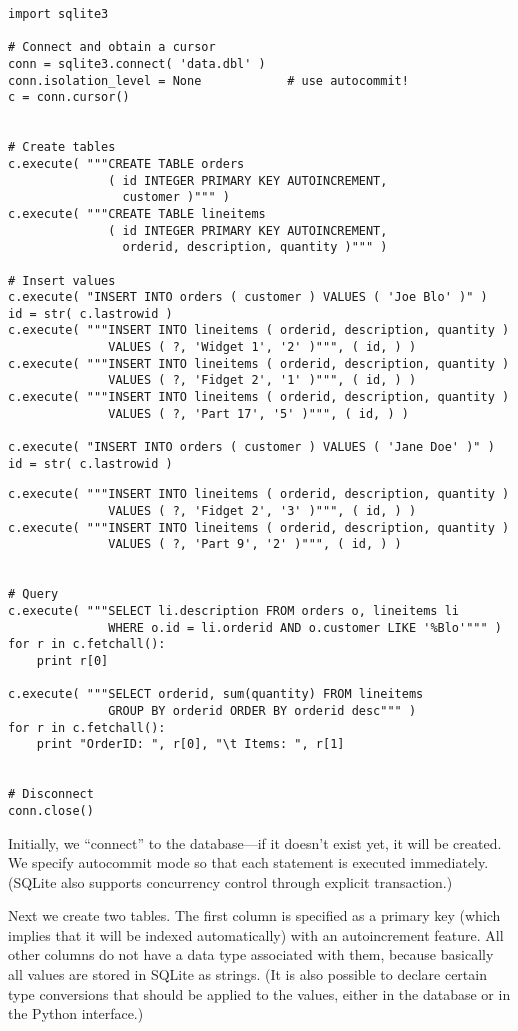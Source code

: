 \begin{verbatim}
import sqlite3

# Connect and obtain a cursor 
conn = sqlite3.connect( 'data.dbl' )
conn.isolation_level = None            # use autocommit!
c = conn.cursor()


# Create tables
c.execute( """CREATE TABLE orders
              ( id INTEGER PRIMARY KEY AUTOINCREMENT,
                customer )""" )
c.execute( """CREATE TABLE lineitems
              ( id INTEGER PRIMARY KEY AUTOINCREMENT,
                orderid, description, quantity )""" )

# Insert values
c.execute( "INSERT INTO orders ( customer ) VALUES ( 'Joe Blo' )" )
id = str( c.lastrowid )
c.execute( """INSERT INTO lineitems ( orderid, description, quantity )
              VALUES ( ?, 'Widget 1', '2' )""", ( id, ) )
c.execute( """INSERT INTO lineitems ( orderid, description, quantity )
              VALUES ( ?, 'Fidget 2', '1' )""", ( id, ) )
c.execute( """INSERT INTO lineitems ( orderid, description, quantity )
              VALUES ( ?, 'Part 17', '5' )""", ( id, ) )

c.execute( "INSERT INTO orders ( customer ) VALUES ( 'Jane Doe' )" )
id = str( c.lastrowid )
\end{verbatim}\clearpage
\begin{verbatim}
c.execute( """INSERT INTO lineitems ( orderid, description, quantity )
              VALUES ( ?, 'Fidget 2', '3' )""", ( id, ) )
c.execute( """INSERT INTO lineitems ( orderid, description, quantity )
              VALUES ( ?, 'Part 9', '2' )""", ( id, ) )


# Query
c.execute( """SELECT li.description FROM orders o, lineitems li
              WHERE o.id = li.orderid AND o.customer LIKE '%Blo'""" )
for r in c.fetchall():
    print r[0]

c.execute( """SELECT orderid, sum(quantity) FROM lineitems
              GROUP BY orderid ORDER BY orderid desc""" )
for r in c.fetchall():
    print "OrderID: ", r[0], "\t Items: ", r[1]


# Disconnect
conn.close()
\end{verbatim}\vspace*{-6pt}

Initially, we ``connect'' to the database---if it doesn't exist yet,
it will be created. We specify autocommit mode so that each statement
is executed immediately. (SQLite also supports concurrency control
through explicit transaction.)

Next we create two tables. The first column is specified as a primary
key (which implies that it will be indexed automatically) with an
autoincrement feature. All other columns do not have a data type
associated with them, because basically all values are stored in
SQLite as strings. (It is also possible to declare certain type
conversions that should be applied to the values, either in the
database or in the Python interface.)


